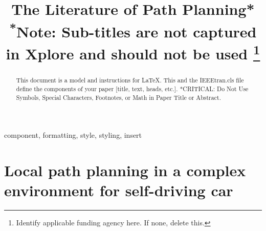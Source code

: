 \documentclass[conference]{IEEEtran}
\begin{document}
\title{The Literature of Path Planning*\\
{\footnotesize \textsuperscript{*}Note: Sub-titles are not captured in Xplore and
should not be used}
\thanks{Identify applicable funding agency here. If none, delete this.}
}

\author{
\and
{}
\and
{}

}

\maketitle

\begin{abstract}
This document is a model and instructions for \LaTeX.
This and the IEEEtran.cls file define the components of your paper [title, text, heads, etc.]. *CRITICAL: Do Not Use Symbols, Special Characters, Footnotes, 
or Math in Paper Title or Abstract.
\end{abstract}

\begin{IEEEkeywords}
component, formatting, style, styling, insert
\end{IEEEkeywords}

\section{Local path planning in a complex environment for self-driving car}
\end{document}
